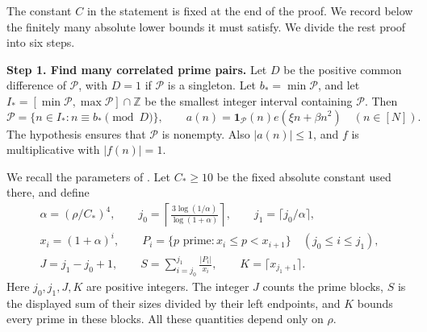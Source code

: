 \documentclass[twoside]{aomart}
\makeatletter
\theoremstyle{paperplain}
\theoremstyle{paperdefinition}
\renewenvironment{proof}[1][\proofname]{\par\pushQED{\qed}%
  \normalfont\topsep6\p@\@plus3\p@\relax\trivlist
  \item[\hskip\labelsep\itshape #1\@addpunct{.}]\ignorespaces
}{\popQED\endtrivlist\@endpefalse}
\numberwithin{equation}{section}
\makeatother
\begin{document}
\begin{proof}
The constant $C$ in the statement is fixed at the end of the proof.
We record below the finitely many absolute lower bounds it must satisfy. We divide the rest proof into six steps.

\par
\medskip
\noindent\textbf{Step 1. Find many correlated prime pairs.}
Let $D$ be the positive common difference of $\mathcal P$,
with $D=1$ if $\mathcal P$ is a singleton. Let $b_*=\min\mathcal P$,
and let $I_*=[\min\mathcal P,\max\mathcal P]\cap\mathbb Z$
be the smallest integer interval containing $\mathcal P$. Then
\begin{equation*}
 \mathcal P=\{n\in I_*:n\equiv b_*\pmod D\},\qquad
 a(n)=\mathbf1_{\mathcal P}(n)e(\xi n+\beta n^2)
 \quad(n\in[N]).
\end{equation*}
The hypothesis ensures that $\mathcal P$ is nonempty.
Also $|a(n)|\le1$, and $f$ is multiplicative with $|f(n)|=1$.

We recall the parameters of . Let $C_*\ge10$
be the fixed absolute constant used there, and define
\begin{equation*}
 \begin{gathered}
 \alpha=(\rho/C_*)^4,\qquad
 j_0=\left\lceil\frac{3\log(1/\alpha)}{\log(1+\alpha)}\right\rceil,
 \qquad j_1=\lceil j_0/\alpha\rceil,\\
 x_i=(1+\alpha)^i,\qquad
 P_i=\{p\text{ prime}:x_i\le p<x_{i+1}\}
 \quad(j_0\le i\le j_1),\\
 J=j_1-j_0+1,\qquad
 S=\sum_{i=j_0}^{j_1}\frac{|P_i|}{x_i},\qquad
 K=\lceil x_{j_1+1}\rceil.
 \end{gathered}
\end{equation*}
Here $j_0,j_1,J,K$ are positive integers. The integer $J$ counts
the prime blocks, $S$ is the displayed sum of their sizes divided
by their left endpoints, and $K$ bounds every prime in these blocks.
All these quantities depend only on $\rho$.


\end{proof}
\end{document}
